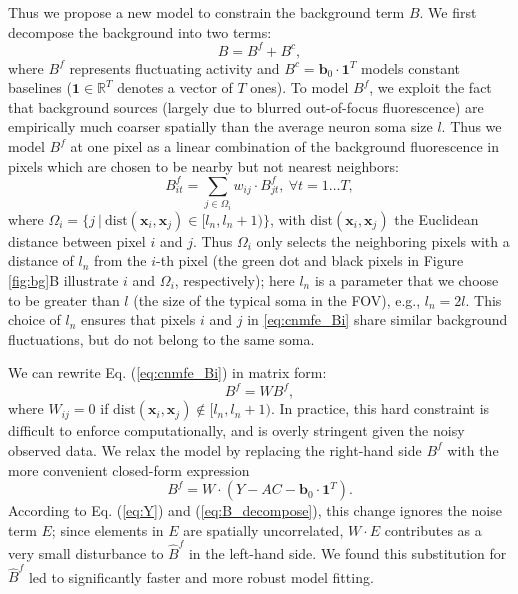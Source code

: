 \documentclass[9pt,lineno]{elife}
\begin{document}
Thus we propose a new model to constrain the background term $B$. We first decompose the background into two terms:
\begin{equation}
  B = B^f + B^c,   \label{eq:B_decompose}
\end{equation}
where $B^f$ represents fluctuating activity and  $B^c=\bm{b}_0\cdot \bm{1}^T$ models constant baselines ($\bm{1}\in\mathbb{R}^T$ denotes a vector of $T$ ones). To model $B^f$, we exploit the fact that background sources (largely due to blurred out-of-focus fluorescence) are empirically much coarser spatially than the average neuron soma size $l$. Thus we model $B^f$ at one pixel as a linear combination of the background fluorescence in pixels which are chosen to be nearby but not nearest neighbors:
\begin{equation}
  B_{it}^f=\sum_{j\in \Omega_i} w_{ij}\cdot B^f_{jt}, ~ \forall t=1\ldots T, \label{eq:cnmfe_Bi}
\end{equation}
where $\Omega_i = \{j ~ | ~ \text{dist}(\bm{x}_i,\bm{x}_j) \in [l_n, l_n+1)\}$, with $\text{dist}(\bm{x}_i, \bm{x}_j)$ the Euclidean distance between pixel $i$ and $j$. Thus $\Omega_i$ only selects the neighboring pixels with a distance of $l_n$ from the $i$-th pixel (the green dot and black pixels in Figure \ref{fig:bg}B illustrate $i$ and $\Omega_i$, respectively); here $l_n$ is a parameter that we choose to be greater than $l$ (the size of the typical soma in the FOV), e.g., $l_n= 2 l$. This choice of $l_n$ ensures that pixels $i$ and $j$ in \eqref{eq:cnmfe_Bi} share similar background fluctuations, but do not belong to the same soma.

We can rewrite Eq. (\ref{eq:cnmfe_Bi}) in matrix form: 
\begin{equation}
    B^f = W B^f ,        \label{eq:cnmfe_B}
\end{equation}
where $W_{ij}= 0 $ if $\text{dist}(\bm{x}_i,\bm{x}_j) \notin [l_n, l_n+1)$. In practice, this hard constraint is difficult to enforce computationally, and is overly stringent given the noisy observed data. We relax the model by replacing the right-hand side $B^f$ with the more convenient closed-form expression
\begin{equation}
B^f = W\cdot(Y-AC-\bm{b}_0\cdot \bm{1}^T). \label{eq:Bf}
\end{equation} 
According to Eq. (\ref{eq:Y}) and (\ref{eq:B_decompose}), this change ignores the noise term $E$; since elements in $E$ are spatially uncorrelated, $W \cdot E$ contributes as a very small disturbance to $\hat{B}^f$ in the left-hand side. We found this substitution for $\hat{B}^f$ led to significantly faster and more robust model fitting.
\end{document}
